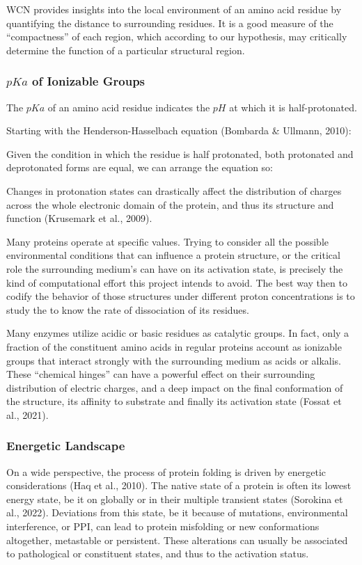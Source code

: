 \documentclass{article}
\begin{document}
WCN provides insights into the local environment of an amino acid residue by quantifying the distance to surrounding residues. It is a good measure of the “compactness” of each region, which according to our hypothesis, may critically determine the function of a particular structural region.

\subsubsection{\(pKa\) of Ionizable Groups}

The \(pKa\) of an amino acid residue indicates the \(pH\) at which it is half-protonated.

Starting with the Henderson-Hasselbach equation (Bombarda \& Ullmann, 2010):

Given the condition in which the residue is half protonated, both protonated and deprotonated forms are equal, we can arrange the equation so:

Changes in protonation states can drastically affect the distribution of charges across the whole electronic domain of the protein, and thus its structure and function (Krusemark et al., 2009). 

Many proteins operate at specific  values. Trying to consider all the possible environmental conditions that can influence a protein structure, or the critical role the surrounding medium’s  can have on its activation state, is precisely the kind of computational effort this project intends to avoid. The best way then to codify the behavior of those structures under different proton concentrations is to study the  to know the rate of dissociation of its residues.

Many enzymes utilize acidic or basic residues as catalytic groups. In fact, only a fraction of the constituent amino acids in regular proteins account as ionizable groups that interact strongly with the surrounding medium as acids or alkalis. These “chemical hinges” can have a powerful effect on their surrounding distribution of electric charges, and a deep impact on the final conformation of the structure, its affinity to substrate and finally its activation state (Fossat et al., 2021).

\subsubsection{Energetic Landscape}

On a wide perspective, the process of protein folding is driven by energetic considerations (Haq et al., 2010). The native state of a protein is often its lowest energy state, be it on globally or in their multiple transient states (Sorokina et al., 2022). Deviations from this state, be it because of mutations, environmental interference, or PPI, can lead to protein misfolding or new conformations altogether, metastable or persistent. These alterations can usually be associated to pathological or constituent states, and thus to the activation status.
\end{document}
